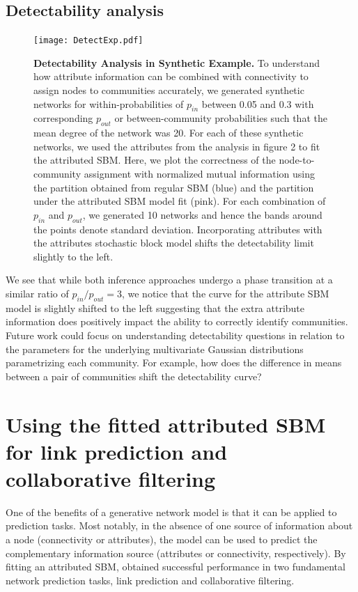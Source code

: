 \subsection{Detectability analysis}
\begin{figure}[h!]
\begin{center}
\texttt{[image: DetectExp.pdf]}
\caption{{\bf Detectability Analysis in Synthetic Example.} To understand how attribute information can be combined with connectivity to assign nodes to communities accurately, we generated synthetic networks for within-probabilities of $p_{in}$ between 0.05 and 0.3 with corresponding $p_{out}$ or between-community probabilities such that the mean degree of the network was 20. For each of these synthetic networks, we used the attributes from the analysis in figure 2 to fit the attributed SBM. Here, we plot the correctness of the node-to-community assignment with normalized mutual information using the partition obtained from regular SBM (blue) and the partition under the attributed SBM model fit (pink). For each combination of $p_{in}$ and $p_{out}$, we generated 10 networks and hence the bands around the points denote standard deviation. Incorporating attributes with the attributes stochastic block model shifts the detectability limit slightly to the left. }
\label{Att:Detect}
\end{center}
\end{figure}

We see that while both inference approaches undergo a phase transition at a similar ratio of $p_{in}/p_{out}=3$, we notice that the curve for the attribute SBM model is slightly shifted to the left suggesting that the extra attribute information does positively impact the ability to correctly identify communities. Future work could focus on understanding detectability questions in relation to the parameters for the underlying multivariate Gaussian distributions parametrizing each community. For example, how does the difference in means between a pair of communities shift the detectability curve?

\section{Using the fitted attributed SBM for link prediction and collaborative filtering}
One of the benefits of a generative network model is that it can be applied to prediction tasks. Most notably, in the absence of one source of information about a node (connectivity or attributes), the model can be used to predict the complementary information source (attributes or connectivity, respectively). By fitting an attributed SBM, obtained successful performance in two fundamental network prediction tasks, link prediction and collaborative filtering. 

